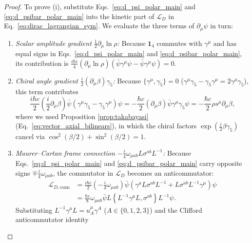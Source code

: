 \documentclass[11pt, a4paper]{article}
\theoremstyle{definition}
\begin{document}
\begin{proof}
To prove (i), substitute Eqs.~\eqref{eq:d_psi_polar_main} and \eqref{eq:d_psibar_polar_main} into the kinetic part of $\mathcal{L}_D$ in Eq.~\eqref{eq:dirac_lagrangian_sym}. We evaluate the three terms of $\partial_\mu \psi$ in turn:
\begin{enumerate}[label=\arabic*., nosep]
    \item \textit{Scalar amplitude gradient $\frac{1}{2}\partial_\mu \ln\rho$:} Because $\mathbf{1}_4$ commutes with $\gamma^\mu$ and has equal signs in Eqs.~\eqref{eq:d_psi_polar_main} and \eqref{eq:d_psibar_polar_main}, its contribution is $\frac{i\hbar c}{4}(\partial_\mu \ln\rho)(\bar{\psi}\gamma^\mu\psi - \bar{\psi}\gamma^\mu\psi) = 0$.
    \item \textit{Chiral angle gradient $\frac{i}{2}(\partial_\mu \beta)\gamma_5$:} Because $\{\gamma^\mu, \gamma_5\} = 0$ ($\gamma^\mu \gamma_5 - \gamma_5 \gamma^\mu = 2\gamma^\mu \gamma_5$), this term contributes
    \begin{equation}
    \frac{i\hbar c}{2}\left(\frac{i}{2}\partial_\mu \beta\right) \bar{\psi}(\gamma^\mu \gamma_5 - \gamma_5 \gamma^\mu)\psi = -\frac{\hbar c}{2}(\partial_\mu \beta)\bar{\psi}\gamma^\mu \gamma_5 \psi = -\frac{\hbar c}{2}\rho s^\mu \partial_\mu \beta,
    \end{equation}
    where we used Proposition \ref{prop:takabayasi} (Eq.~\eqref{eq:vector_axial_bilinears}), in which the chiral factors $\exp(\frac{i}{2}\beta\gamma_5)$ cancel via $\cos^2(\beta/2) + \sin^2(\beta/2) = 1$.
    \item \textit{Maurer--Cartan frame connection $-\frac{i}{4}\omega_{\mu ab} L\sigma^{ab}L^{-1}$:} Because Eqs.~\eqref{eq:d_psi_polar_main} and \eqref{eq:d_psibar_polar_main} carry opposite signs $\mp \frac{i}{4}\omega_{\mu ab}$, the commutator in $\mathcal{L}_D$ becomes an anticommutator:
    \begin{equation}
    \begin{aligned}
    \mathcal{L}_{D,\text{conn}} &= \frac{i\hbar c}{2}\left(-\frac{i}{4}\omega_{\mu ab}\right) \bar{\psi}\left( \gamma^\mu L\sigma^{ab}L^{-1} + L\sigma^{ab}L^{-1}\gamma^\mu \right)\psi \\
    &= \frac{\hbar c}{8}\omega_{\mu ab} \bar{\psi} L \left\{ L^{-1}\gamma^\mu L, \sigma^{ab} \right\} L^{-1}\psi.
    \end{aligned}
    \end{equation}
    Substituting $L^{-1}\gamma^\mu L = u_A^\mu \gamma^A$ ($A \in \{0,1,2,3\}$) and the Clifford anticommutator identity

\end{enumerate}
\end{proof}
\end{document}

